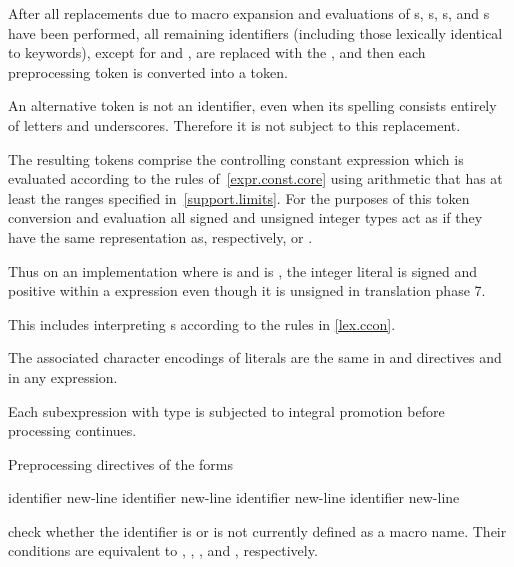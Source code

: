 \pnum
After all replacements due to macro expansion and
evaluations of
s,
s,
s, and
s
have been performed,
all remaining identifiers (including those lexically identical to keywords),
except for
and
,
are replaced with the 
,
and then each preprocessing token is converted into a token.
\begin{note}
An alternative
token is not an identifier,
even when its spelling consists entirely of letters and underscores.
Therefore it is not subject to this replacement.
\end{note}

\pnum
The resulting tokens comprise the controlling constant expression
which is evaluated according to the rules of~\ref{expr.const.core}
using arithmetic that has at least the ranges specified
in~\ref{support.limits}. For the purposes of this token conversion and evaluation
all signed and unsigned integer types
act as if they have the same representation as, respectively,
 or .
\begin{note}
Thus on an
implementation where  is 
and  is ,
the integer literal  is signed and positive within a 
expression even though it is unsigned in translation phase
7.
\end{note}
This includes interpreting s
according to the rules in \ref{lex.ccon}.
\begin{note}
The associated character encodings of literals are the same
in  and  directives and in any expression.
\end{note}
Each subexpression with type
is subjected to integral promotion before processing continues.

\pnum
Preprocessing directives of the forms
\begin{ncsimplebnf}
 identifier new-line \br
{}%
 identifier new-line \br
{}%
 identifier new-line \br
{}%
 identifier new-line 
%
\end{ncsimplebnf}
check whether the identifier is or is not currently defined as a macro name.
Their conditions are equivalent to
  ,
  ,
  , and
  ,
respectively.

